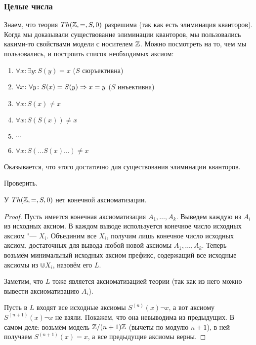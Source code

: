 \subsubsection{Целые числа}
Знаем, что теория $Th(\mathbb{Z}, =, S, 0)$ разрешима (так как есть элиминация кванторов).
Когда мы доказывали существование элиминации кванторов, мы пользовались какими-то
свойствами модели с носителем $\mathbb{Z}$.
Можно посмотреть на то, чем мы пользовались, и построить список необходимых аксиом:
\begin{enumerate}
	\item $\forall x \colon \exists y \colon S(y)=x$ ($S$ сюръективна)
	\item $\forall x \colon \forall y \colon S(x) = S(y) \Rightarrow x = y$ ($S$ инъективна)
	\item $\forall x \colon S(x) \ne x$
	\item $\forall x \colon S(S(x)) \ne x$
	\item $\cdots$
	\item $\forall x \colon S(\dots S(x) \dots) \ne x$
\end{enumerate}
Оказывается, что этого достаточно для существования элиминации кванторов.
\begin{Exercise}
	Проверить.
\end{Exercise}

\begin{theorem}
	У $Th(\mathbb{Z}, =, S, 0)$ нет конечной аксиоматизации.
\end{theorem}
\begin{proof}
	Пусть имеется конечная аксиоматизация $A_1, \dots, A_k$.
	Выведем каждую из $A_i$ из исходных аксиом.
	В каждом выводе используется конечное число исходных аксиом "--- $X_i$.
	Объединим все $X_i$, получим лишь конечное число исходных аксиом,
	достаточных для вывода любой новой аксиомы $A_1, \dots, A_k$.
	Теперь возьмём минимальный исходных аксиом префикс, содержащий все исходные аксиомы из $\Cup X_i$,
	назовём его $L$.

	Заметим, что $L$ тоже является аксиоматизацией теории (так как из него можно вывести
	аксиоматизацию $A_i$).

	Пусть в $L$ входят все исходные аксиомы $S^{(n)}(x) \lnot x$, а вот аксиому $S^{(n+1)}(x) \lnot x$ не взяли.
	Покажем, что она невыводима из предыдущих.
	В самом деле: возьмём модель $\mathbb{Z}/(n+1)\mathbb{Z}$ (вычеты по модулю $n+1$), в ней получаем $S^{(n+1)}(x) = x$,
	а все предыдущие аксиомы верны.
\end{proof}

